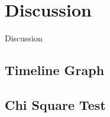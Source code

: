 \chapter{Discussion}
Discussion
\section{Timeline Graph} \label{sec:discussion}

\section{Chi Square Test}

